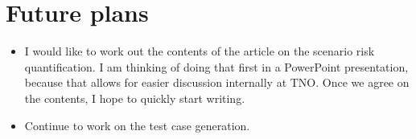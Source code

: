 \documentclass[10pt,final,a4paper,oneside,onecolumn]{article}
\begin{document}
\section{Future plans}

%

\begin{itemize}
	\item I would like to work out the contents of the article on the scenario risk quantification. I am thinking of doing that first in a PowerPoint presentation, because that allows for easier discussion internally at TNO. Once we agree on the contents, I hope to quickly start writing.
	\item Continue to work on the test case generation.
\end{itemize}


\printbibliography

%
\end{document}
